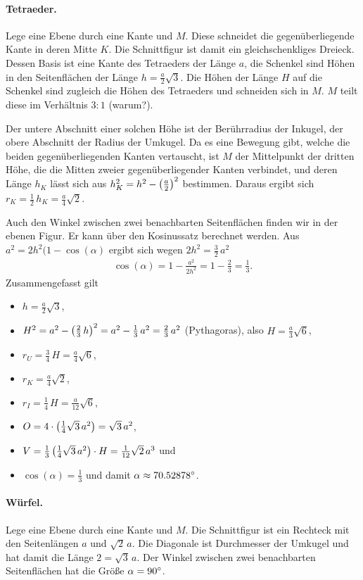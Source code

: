 \documentclass[11pt]{article}
\begin{document}
\paragraph{Tetraeder.}
Lege eine Ebene durch eine Kante und $M$. Diese schneidet die
gegenüberliegende Kante in deren Mitte $K$. Die Schnittfigur ist damit ein
gleichschenkliges Dreieck. Dessen Basis ist eine Kante des Tetraeders der
Länge $a$, die Schenkel sind Höhen in den Seitenflächen der Länge
$h=\frac{a}{2}\sqrt{3}$.  Die Höhen der Länge $H$ auf die Schenkel sind
zugleich die Höhen des Tetraeders und schneiden sich in $M$.  $M$ teilt diese
im Verhältnis $3:1$ (warum?). 

Der untere Abschnitt einer solchen Höhe ist der Berührradius der Inkugel, der
obere Abschnitt der Radius der Umkugel.  Da es eine Bewegung gibt, welche die
beiden gegenüberliegenden Kanten vertauscht, ist $M$ der Mittelpunkt der
dritten Höhe, die die Mitten zweier gegenüberliegender Kanten verbindet, und
deren Länge $h_K$ lässt sich aus $h_K^2=h^2-\left(\frac{a}{2}\right)^2$ bestimmen.
Daraus ergibt sich $r_K=\frac12\,h_K=\frac{a}{4}\sqrt{2}$.
\newpage

Auch den Winkel zwischen zwei benachbarten Seitenflächen finden wir in der
ebenen Figur.  Er kann über den Kosinussatz berechnet werden. Aus
$a^2=2h^2(1-\cos(\alpha)$ ergibt sich wegen $2h^2=\frac32\,a^2$
\begin{gather*}
  \cos(\alpha)=1-\frac{a^2}{2h^2}=1-\frac23=\frac13.
\end{gather*}
Zusammengefasst gilt
\begin{itemize}
\item $h=\frac{a}{2}\sqrt{3}$,
\item $H^2=a^2-\left(\frac23\,h\right)^2=a^2-\frac13\,a^2=\frac23\,a^2$ (Pythagoras),
  also $H=\frac{a}{3}\sqrt{6}$,
\item $r_U=\frac34\,H=\frac{a}{4}\sqrt{6}$,
\item $r_K=\frac{a}{4}\sqrt{2}$, 
\item $r_I=\frac14\,H=\frac{a}{12}\sqrt{6}$,
\item $O=4\cdot \left(\frac14\sqrt{3}\,a^2\right)=\sqrt{3}\,a^2$, 
\item $V=\frac13 \left(\frac14\sqrt{3}\,a^2\right)\cdot H = \frac{1}{12}\sqrt{2}\,a^3$
  und 
\item $\cos(\alpha)=\frac13$ und damit $\alpha\approx 70.52878^{\circ}$.
\end{itemize}

\paragraph{Würfel.}
Lege eine Ebene durch eine Kante und $M$. Die Schnittfigur ist ein Rechteck
mit den Seitenlängen $a$ und $\sqrt{2}\,a$.  Die Diagonale ist Durchmesser der
Umkugel und hat damit die Länge $2=\sqrt{3}\,a$. Der Winkel zwischen zwei
benachbarten Seitenflächen hat die Größe $\alpha=90^{\circ}$.
\end{document}
